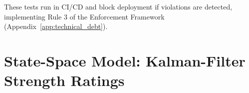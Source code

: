 These tests run in CI/CD and block deployment if violations are detected, implementing Rule 3 of the Enforcement Framework (Appendix~\ref{app:technical_debt}).

\section{State-Space Model: Kalman-Filter Strength Ratings}
\label{sec:state-space-model}












